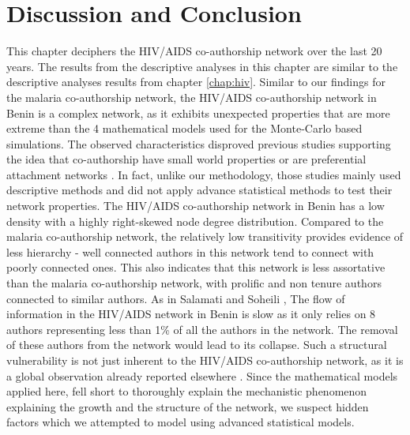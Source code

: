 \section{Discussion and Conclusion}
\label{sec:hiv_discussion}
This chapter deciphers the HIV/AIDS co-authorship network over the last 20 years. The results from the descriptive analyses in this chapter are similar to the descriptive analyses results from chapter \ref{chap:hiv}. Similar to our findings for the malaria co-authorship network, the HIV/AIDS co-authorship network in Benin is a complex network, as it exhibits unexpected properties that are more extreme than the 4 mathematical models used for the Monte-Carlo based simulations. The observed characteristics disproved previous studies supporting the idea that co-authorship have small world properties \cite{gonzalez-alcaide_scientific_2012} or are preferential attachment networks \citep{wagner_network_2005}. In fact, unlike our methodology, those studies mainly used descriptive methods and did not apply advance statistical methods to test their network properties.
The HIV/AIDS co-authorship network in Benin has a low density with a highly right-skewed node degree distribution. Compared to the malaria co-authorship network, the relatively low transitivity provides evidence of less hierarchy - well connected authors in this network tend to connect with poorly connected ones. This also indicates that this network is less assortative than the malaria co-authorship network, with prolific and non tenure authors connected to similar authors.
As in Salamati and Soheili \cite{salamati_social_2016}, The flow of information in the HIV/AIDS network in Benin is slow as it only relies on 8 authors representing less than 1\% of all the authors in the network. The removal of these authors from the network would lead to its collapse. Such a structural vulnerability is not just inherent to the HIV/AIDS co-authorship network, as it is a global observation already reported elsewhere \cite{toivanen_african_2011}.  Since the mathematical models applied here, fell short to thoroughly explain the mechanistic phenomenon explaining the growth and the structure of the network, we suspect hidden factors which we attempted to model using advanced statistical models. \\
